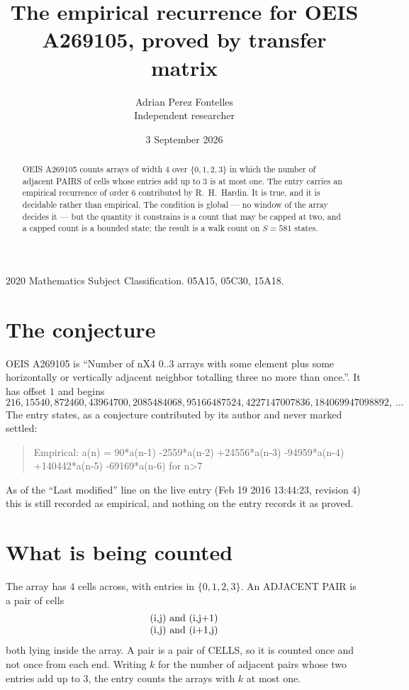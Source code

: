 \documentclass[11pt,a4paper]{article}
\title{The empirical recurrence for OEIS A269105, proved by transfer matrix}
\author{Adrian Perez Fontelles\\ \small Independent researcher}
\date{3 September 2026}
\theoremstyle{plain}
\theoremstyle{definition}
\begin{document}
\maketitle

\begin{abstract}
OEIS A269105 counts arrays of width $4$ over $\{0,1,2,3\}$ in which the number of adjacent PAIRS of
cells whose entries add up to $3$ is at most one. The entry carries an empirical recurrence of
order $6$ contributed by R.~H.~Hardin. It is true, and it is decidable rather than
empirical. The condition is global --- no window of the array decides it --- but the quantity
it constrains is a count that may be capped at two, and a capped count is a bounded state; the
result is a walk count on $S=581$ states.
\end{abstract}

\noindent\small 2020 Mathematics Subject Classification. 05A15, 05C30, 15A18.\normalsize

\section{The conjecture}

OEIS A269105 is ``Number of nX4 0..3 arrays with some element plus some horizontally or vertically adjacent neighbor totalling three no more than once.''. It has offset $1$ and begins
\[
216, 15540, 872460, 43964700, 2085484068, 95166487524, 4227147007836, 184069947098892,\ \dots
\]
The entry states, as a conjecture contributed by its author and never marked settled:
\begin{quote}
Empirical: a(n) = 90*a(n-1) -2559*a(n-2) +24556*a(n-3) -94959*a(n-4) +140442*a(n-5) -69169*a(n-6) for n>7
\end{quote}
As of the ``Last modified'' line on the live entry (Feb 19 2016 13:44:23, revision 4) this is still
recorded as empirical, and nothing on the entry records it as proved.

\section{What is being counted}

The array has $4$ cells across, with entries in $\{0,1,2,3\}$. An ADJACENT PAIR is a pair of cells
\[
\begin{array}{l}
$(i,j)\text{ and }(i,j{+}1)$ \\
$(i,j)\text{ and }(i{+}1,j)$ \\
\end{array}
\]
both lying inside the array. A pair is a pair of CELLS, so it is counted once and not once from
each end. Writing $k$ for the number of adjacent pairs whose two entries add up to $3$, the
entry counts the arrays with $k$ at most one.
\end{document}
